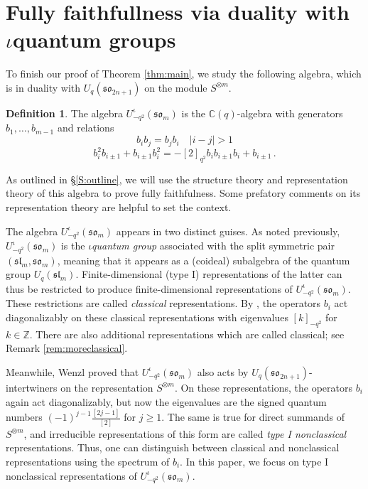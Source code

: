 \documentclass[10pt]{amsart}
\numberwithin{equation}{section}
\theoremstyle{definition}
\newtheorem{defn}[thm]{Definition}
\def\C{{\mathbb C}}
\newcommand{\slm}{\mathfrak{sl}_{m}}
\newcommand{\son}[1][2n+1]{\mathfrak{so}_{#1}}
\newcommand{\som}[1][m]{\mathfrak{so}_{#1}}
\newcommand{\iqUsom}[1][m]{{U}^{\iota}_{-q^2}(\som[#1])}
\begin{document}
\section{Fully faithfullness via duality with $\iota$quantum groups}\label{ss:FF}

To finish our proof of Theorem \ref{thm:main}, 
we study the following algebra, 
which is in duality with $U_q(\son)$ on the module $S^{\otimes m}$.

\begin{defn}\label{def:iQ}
The algebra
$\iqUsom$ is the $\C(q)$-algebra with generators $b_1, \dots, b_{m-1}$ and relations 
\begin{equation}\label{eqn:farcommute}
b_ib_j = b_jb_i \quad |i-j|>1
\end{equation}
\begin{equation}\label{eqn:iSerre-alg-version}
b_i^2b_{i\pm 1} + b_{i\pm 1}b_i^2 = -[2]_{q^2}b_ib_{i\pm 1}b_i + b_{i\pm 1} \, .
\end{equation}
\end{defn}

As outlined in \S\ref{S:outline}, 
we will use the structure theory and representation theory of this algebra to prove fully faithfulness. 
Some prefatory comments on its representation theory are helpful to set the context.

The algebra $\iqUsom$ appears in two distinct guises. 
As noted previously, 
$\iqUsom$ is the $\iota$\emph{quantum group} associated with the split symmetric pair $(\slm, \som)$, 
meaning that it appears as a (coideal) subalgebra of the quantum group $U_q(\slm)$. 
Finite-dimensional (type I) representations of the latter
can thus be restricted to produce finite-dimensional representations of $\iqUsom$.
These restrictions are called \emph{classical} representations. 
By \cite{MR2143754}, the operators $b_i$ act diagonalizably on these classical representations
with eigenvalues $[k]_{-q^2}$ for $k\in \mathbb{Z}$. 
There are also additional representations which are called classical; 
see Remark \ref{rem:moreclassical}.

Meanwhile, Wenzl \cite{Wenzl-Spin} 
proved that $\iqUsom$ also acts by $U_q(\son)$-intertwiners on the representation $S^{\otimes m}$. 
On these representations, 
the operators $b_i$ again act diagonalizably, 
but now the eigenvalues are the signed quantum numbers $(-1)^{j-1} \frac{[2j-1]}{[2]}$ for $j \ge 1$. 
The same is true for direct summands of $S^{\otimes m}$, 
and irreducible representations of this form are called \emph{type I nonclassical} representations. 
Thus, one can distinguish between classical and nonclassical representations using the spectrum of $b_i$. 
In this paper, we focus on type I nonclassical representations of $\iqUsom$.
\end{document}
